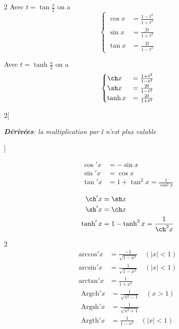 \documentclass[class=report,crop=false]{standalone}
\begin{document}

\begin{multicols}{2}
Avec \quad $t=\tan \frac{x}{2}$ \quad on a \quad
$$
\begin{cases}
    \cos x &= \frac {1-t^2}{1+t^2} \\
    \sin x &= \frac{2t}{1+t^2} \\
    \tan x &= \frac{2t}{1-t^2}
\end{cases}$$

Avec \quad $t=\tanh \frac{x}{2}$ \quad on a \quad
$$
\begin{cases}
    \ch x &= \frac {1+t^2}{1-t^2} \\
    \sh x &= \frac{2t}{1-t^2} \\
    \tanh x &= \frac{2t}{1+t^2}
\end{cases}$$
\end{multicols}

\vspace{2cm}
\begin{multicols}{2}[\begin{center}
\emph{\textbf{D\'eriv\'ees}: la multiplication par $\ii$ n'est plus valable}
\end{center}]


\begin{align*}
\cos'x&= -\sin x\\
\sin'x&=\cos x\\
\tan' x &= 1+\tan^2x=\frac{1}{\cos^2x}\\
\end{align*}\vspace{0.1cm}
\begin{align*}
\ch'x&= \sh x\\
\sh'x&=\ch x\\
\tanh' x &= 1-\tanh^2x=\frac{1}{\ch^2x}\\
\end{align*}
\end{multicols}


\begin{multicols}{2}
\begin{align*}
\text{arccos}'x&=\frac{-1}{\sqrt{1-x^2}} \quad (|x|<1)\\
\text{arcsin}'x&=\frac{1}{\sqrt{1-x^2}} \quad (|x|<1)\\
\text{arctan}'x&=\frac{1}{1+x^2}
\end{align*}%
\begin{align*}
\text{Argch}'x&=\frac{1}{\sqrt{x^2-1}} \quad (x>1)\\
\text{Argsh}'x&=\frac{1}{\sqrt{x^2+1}} \\
\text{Argth}'x&=\frac{1}{1-x^2} \quad (|x|<1)
\end{align*}
\end{multicols}
\end{document}
